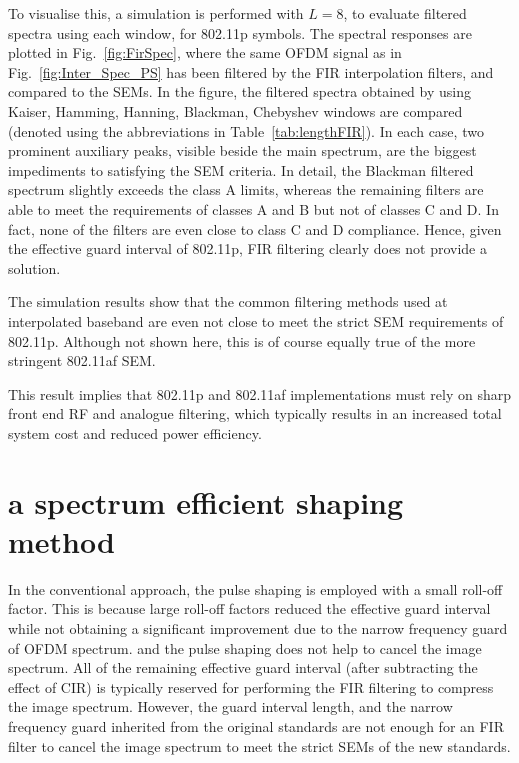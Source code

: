 To visualise this, a simulation is performed with $L=8$, to evaluate filtered spectra using each window, for 802.11p symbols.
The spectral responses are plotted in Fig.~\ref{fig:FirSpec}, where the same OFDM signal as in Fig.~\ref{fig:Inter_Spec_PS} has been filtered by the FIR interpolation filters, and compared to the SEMs.
In the figure, the filtered spectra obtained by using Kaiser, Hamming, Hanning, Blackman, Chebyshev windows are compared (denoted using the abbreviations in Table~\ref{tab:lengthFIR}).
In each case, two prominent auxiliary peaks, visible beside the main spectrum, are the biggest impediments to satisfying the SEM criteria.
In detail, the Blackman filtered spectrum slightly exceeds the class A limits, whereas the remaining filters are able to meet the requirements of classes A and B but not of classes C and D. In fact, none of the filters are even close to class C and D compliance.
Hence, given the effective guard interval of 802.11p, FIR filtering clearly does not provide a solution.

The simulation results show that the common filtering methods used at interpolated baseband are even not close to meet the strict SEM requirements of 802.11p. 
Although not shown here, this is of course equally true of the more stringent 802.11af SEM.

This result implies that 802.11p and 802.11af implementations must rely on sharp front end RF and analogue filtering, which typically results in an increased total system cost and reduced power efficiency.

\section{a spectrum efficient shaping method}
In the conventional approach, the pulse shaping is employed with a small roll-off factor. 
This is because large roll-off factors reduced the effective guard interval while not obtaining a significant  improvement due to the narrow frequency guard of OFDM spectrum.
and the pulse shaping does not help to cancel the image spectrum. 
All of the remaining effective guard interval (after subtracting the effect of CIR) is typically reserved for performing the FIR filtering to compress the image spectrum. 
However, the guard interval length, and the narrow frequency guard inherited from the original standards are not enough for an FIR filter to cancel the image spectrum to meet the strict SEMs of the new standards.


